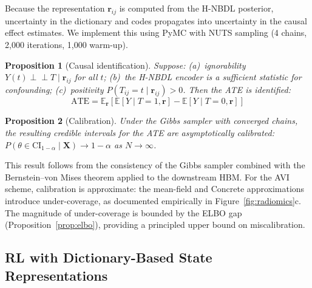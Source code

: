 \documentclass[11pt,a4paper]{article}
\newtheorem{proposition}{Proposition}
\theoremstyle{definition}
\begin{document}
Because the representation $\mathbf{r}_{ij}$ is computed from the H-NBDL posterior, uncertainty in the dictionary and codes propagates into uncertainty in the causal effect estimates. We implement this using PyMC with NUTS sampling (4 chains, 2,000 iterations, 1,000 warm-up).

\begin{proposition}[Causal identification]\label{prop:causal}
Suppose: (a)~ignorability $Y(t) \perp\!\!\!\perp T \mid \mathbf{r}_{ij}$ for all $t$; (b)~the H-NBDL encoder is a sufficient statistic for confounding; (c)~positivity $P(T_{ij}{=}t \mid \mathbf{r}_{ij}) > 0$. Then the ATE is identified:
\begin{equation}
  \mathrm{ATE} = \mathbb{E}_{\mathbf{r}}[\mathbb{E}[Y \mid T{=}1, \mathbf{r}] - \mathbb{E}[Y \mid T{=}0, \mathbf{r}]]
\end{equation}
\end{proposition}

\begin{proposition}[Calibration]\label{prop:calibration}
Under the Gibbs sampler with converged chains, the resulting credible intervals for the ATE are asymptotically calibrated: $P(\theta \in \mathrm{CI}_{1-\alpha} \mid \mathbf{X}) \to 1 - \alpha$ as $N \to \infty$.
\end{proposition}

This result follows from the consistency of the Gibbs sampler combined with the Bernstein--von Mises theorem applied to the downstream HBM. For the AVI scheme, calibration is approximate: the mean-field and Concrete approximations introduce under-coverage, as documented empirically in Figure~\ref{fig:radiomics}c. The magnitude of under-coverage is bounded by the ELBO gap (Proposition~\ref{prop:elbo}), providing a principled upper bound on miscalibration.

\subsection{RL with Dictionary-Based State Representations}\label{sec:rl}
\end{document}

